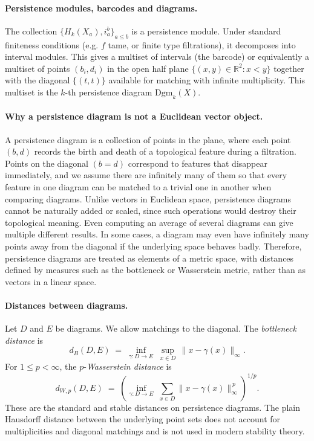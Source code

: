 \paragraph{Persistence modules, barcodes and diagrams.}
The collection $\{H_k(X_a), i_{a}^{b}\}_{a\le b}$ is a persistence module. Under standard finiteness conditions (e.g. $f$ tame, or finite type filtrations), it decomposes into interval modules. This gives a multiset of intervals (the barcode) or equivalently a multiset of points $(b_i,d_i)$ in the open half plane $\{(x,y)\in\mathbb{R}^2: x<y\}$ together with the diagonal $\{(t,t)\}$ available for matching with infinite multiplicity. This multiset is the $k$-th persistence diagram $\mathrm{Dgm}_k(X)$.

\paragraph{Why a persistence diagram is not a Euclidean vector object.}
A persistence diagram is a collection of points in the plane, where each point $(b,d)$ records the birth and death of a topological feature during a filtration. Points on the diagonal $(b=d)$ correspond to features that disappear immediately, and we assume there are infinitely many of them so that every feature in one diagram can be matched to a trivial one in another when comparing diagrams. Unlike vectors in Euclidean space, persistence diagrams cannot be naturally added or scaled, since such operations would destroy their topological meaning. Even computing an average of several diagrams can give multiple different results. In some cases, a diagram may even have infinitely many points away from the diagonal if the underlying space behaves badly. Therefore, persistence diagrams are treated as elements of a metric space, with distances defined by measures such as the bottleneck or Wasserstein metric, rather than as vectors in a linear space.

\paragraph{Distances between diagrams.}
Let $D$ and $E$ be diagrams. We allow matchings to the diagonal. The \emph{bottleneck distance} is
\begin{equation}
d_B(D,E) \;=\; \inf_{\gamma:D\to E} \; \sup_{x\in D} \, \lVert x - \gamma(x) \rVert_{\infty}.
\end{equation}
For $1\le p<\infty$, the $p$-\emph{Wasserstein distance} is
\begin{equation}
d_{W,p}(D,E) \;=\; \left( \inf_{\gamma:D\to E} \; \sum_{x\in D} \lVert x - \gamma(x) \rVert_{\infty}^{\,p} \right)^{1/p}.
\end{equation}
These are the standard and stable distances on persistence diagrams. The plain Hausdorff distance between the underlying point sets does not account for multiplicities and diagonal matchings and is not used in modern stability theory.

